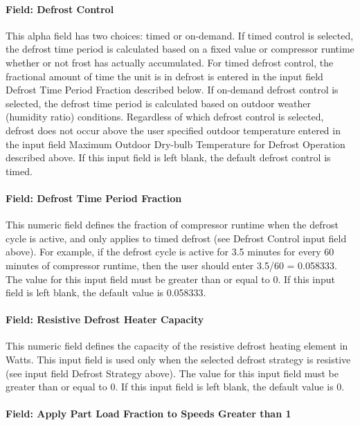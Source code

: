 \paragraph{Field: Defrost Control}\label{field-defrost-control-1}

This alpha field has two choices: timed or on-demand. If timed control is selected, the defrost time period is calculated based on a fixed value or compressor runtime whether or not frost has actually accumulated. For timed defrost control, the fractional amount of time the unit is in defrost is entered in the input field Defrost Time Period Fraction described below. If on-demand defrost control is selected, the defrost time period is calculated based on outdoor weather (humidity ratio) conditions. Regardless of which defrost control is selected, defrost does not occur above the user specified outdoor temperature entered in the input field Maximum Outdoor Dry-bulb Temperature for Defrost Operation described above. If this input field is left blank, the default defrost control is timed.

\paragraph{Field: Defrost Time Period Fraction}\label{field-defrost-time-period-fraction-1}

This numeric field defines the fraction of compressor runtime when the defrost cycle is active, and only applies to timed defrost (see Defrost Control input field above). For example, if the defrost cycle is active for 3.5 minutes for every 60 minutes of compressor runtime, then the user should enter 3.5/60 = 0.058333. The value for this input field must be greater than or equal to 0. If this input field is left blank, the default value is 0.058333.

\paragraph{Field: Resistive Defrost Heater Capacity}\label{field-resistive-defrost-heater-capacity-1}

This numeric field defines the capacity of the resistive defrost heating element in Watts. This input field is used only when the selected defrost strategy is resistive (see input field Defrost Strategy above). The value for this input field must be greater than or equal to 0. If this input field is left blank, the default value is 0.

\paragraph{Field: Apply Part Load Fraction to Speeds Greater than 1}\label{field-apply-part-load-fraction-to-speeds-greater-than-1-1}


